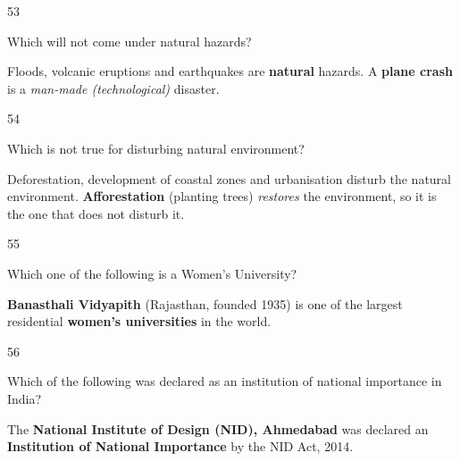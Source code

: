 \begin{question}{53}
{Which will not come under natural hazards?\par}
\begin{explain}
Floods, volcanic eruptions and earthquakes are \textbf{natural} hazards. A \textbf{plane crash} is a \emph{man-made (technological)} disaster.
\end{explain}
\end{question}

\begin{question}{54}
{Which is not true for disturbing natural environment?\par}
\begin{explain}
Deforestation, development of coastal zones and urbanisation disturb the natural environment. \textbf{Afforestation} (planting trees) \emph{restores} the environment, so it is the one that does not disturb it.
\end{explain}
\end{question}

\begin{question}{55}
{Which one of the following is a Women's University?\par}
\begin{explain}
\textbf{Banasthali Vidyapith} (Rajasthan, founded 1935) is one of the largest residential \textbf{women's universities} in the world.
\end{explain}
\end{question}

\begin{question}{56}
{Which of the following was declared as an institution of national importance in India?\par}
\begin{explain}
The \textbf{National Institute of Design (NID), Ahmedabad} was declared an \textbf{Institution of National Importance} by the NID Act, 2014.
\end{explain}
\end{question}

